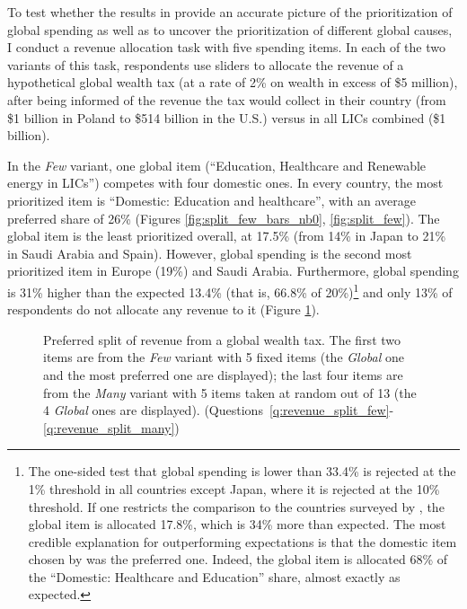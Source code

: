 \documentclass[12pt,english]{article}
\begin{document}
\begin{bibunit}
To test whether the results in \cite{fabre_majority_2025} provide an accurate picture of the %
prioritization of global spending as well as to uncover the prioritization of different global causes, I conduct a revenue allocation task with five spending items. 
In each of the two variants of this task, respondents use sliders to allocate the revenue of a hypothetical global wealth tax (at a rate of 2\% on wealth in excess of \$5 million), after being informed of the revenue the tax would collect in their country (from \$1 billion in Poland to \$514 billion in the U.S.) versus in all LICs combined (\$1 billion). 

In the \textit{Few} variant, one global item (``Education, Healthcare and Renewable energy in LICs'') competes with four domestic ones. %
In every country, the most prioritized item is ``Domestic: Education and healthcare'', with an average preferred share of 26\% (Figures \ref{fig:split_few_bars_nb0}, \ref{fig:split_few}). The global item is the least prioritized overall, at 17.5\% (from 14\% in Japan to 21\% in Saudi Arabia and Spain). However, global spending is the second most prioritized item in Europe (19\%) and Saudi Arabia. Furthermore, global spending is 31\% higher than the expected 13.4\% (that is, 66.8\% of %
20\%)\footnote{The one-sided test that global spending is lower than 33.4\% is rejected at the 1\% threshold in all countries except Japan, where it is rejected at the 10\% threshold. If one restricts the comparison to the countries surveyed by \cite{fabre_majority_2025}, the global item is allocated 17.8\%, which is 34\% more than expected. The most credible explanation for outperforming expectations is that the domestic item chosen by \cite{fabre_majority_2025} was the preferred one. Indeed, the global item is allocated 68\% of the ``Domestic: Healthcare and Education'' share, almost exactly as expected.} 
and only 13\% of respondents do not allocate any revenue to it (Figure \ref{fig:split}). 


\begin{figure}[h!]
  \caption[Preferred split of revenue of a global wealth tax]{Preferred split of revenue from a global wealth tax. The first two items are from the \textit{Few} variant with 5 fixed items (the \textit{Global} one and the most preferred one are displayed); the last four items are from the \textit{Many} variant with 5 items taken at random out of 13 (the 4 \textit{Global} ones are displayed). \hfill (Questions~\ref{q:revenue_split_few}-\ref{q:revenue_split_many})} \label{fig:split}


\end{figure}
\end{bibunit}
\end{document}
